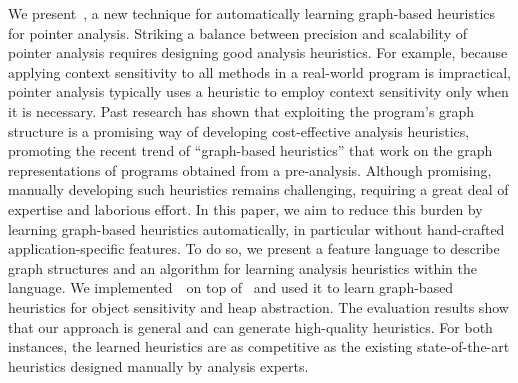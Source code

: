 

We present~\ourtool, a new technique for automatically learning graph-based heuristics for pointer analysis.
Striking a balance between precision and scalability of pointer analysis requires designing good analysis heuristics. For example, because applying context sensitivity to all methods in a real-world program is impractical, pointer analysis typically uses a heuristic to employ context sensitivity only when it is necessary.
Past research has shown that exploiting the program's graph structure is a promising way of developing cost-effective analysis heuristics, promoting the recent trend of ``graph-based heuristics'' that work on the graph representations of programs obtained from a  pre-analysis. 
Although promising, manually developing such heuristics remains challenging, requiring a great deal of expertise and laborious effort.
In this paper, we aim to reduce this burden by learning graph-based heuristics automatically, in particular without hand-crafted application-specific features. To do so, we present a feature language to describe graph structures and an algorithm for learning analysis heuristics within the language.
We implemented~\ourtool~on top of \Doop~and used it to learn graph-based heuristics for object sensitivity and heap abstraction.
The evaluation results show that our approach is general and can generate high-quality heuristics. For both instances,
the learned heuristics are as competitive as the existing state-of-the-art heuristics designed manually by analysis experts.


